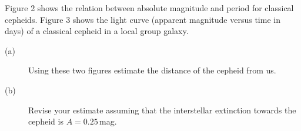 Figure 2 shows the relation between absolute magnitude and period for
classical cepheids. Figure 3 shows the light curve (apparent magnitude versus
time in days) of a classical cepheid in a local group galaxy.

\begin{description}
\item[(a)] Using these two figures estimate the distance of the cepheid from
  us.
\item[(b)] Revise your estimate assuming that the interstellar extinction
  towards the cepheid is $A = 0.25$\,mag.
\end{description}
